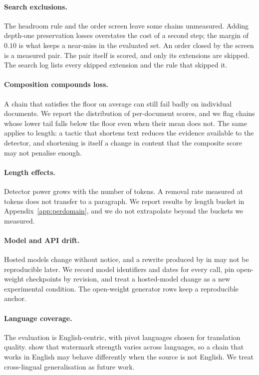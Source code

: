 \paragraph{Search exclusions.}
The headroom rule and the order screen leave some chains unmeasured. Adding depth-one preservation losses overstates the cost of a second step; the margin of $0.10$ is what keeps a near-miss in the evaluated set. An order closed by the screen is a measured pair. The pair itself is scored, and only its extensions are skipped. The search log lists every skipped extension and the rule that skipped it.

\paragraph{Composition compounds loss.}
A chain that satisfies the floor on average can still fail badly on individual documents. We report the distribution of per-document scores, and we flag chains whose lower tail falls below the floor even when their mean does not. The same applies to length: a tactic that shortens text reduces the evidence available to the detector, and shortening is itself a change in content that the composite score may not penalise enough.

\paragraph{Length effects.}
Detector power grows with the number of tokens. A removal rate measured at  tokens does not transfer to a paragraph. We report results by length bucket in Appendix~\ref{app:perdomain}, and we do not extrapolate beyond the buckets we measured.

\paragraph{Model and API drift.}
Hosted models change without notice, and a rewrite produced by  in  may not be reproducible later. We record model identifiers and dates for every call, pin open-weight checkpoints by revision, and treat a hosted-model change as a new experimental condition. The open-weight generator rows keep a reproducible anchor.

\paragraph{Language coverage.}
The evaluation is English-centric, with pivot languages chosen for translation quality. \citet{cwra} show that watermark strength varies across languages, so a chain that works in English may behave differently when the source is not English. We treat cross-lingual generalisation as future work.

